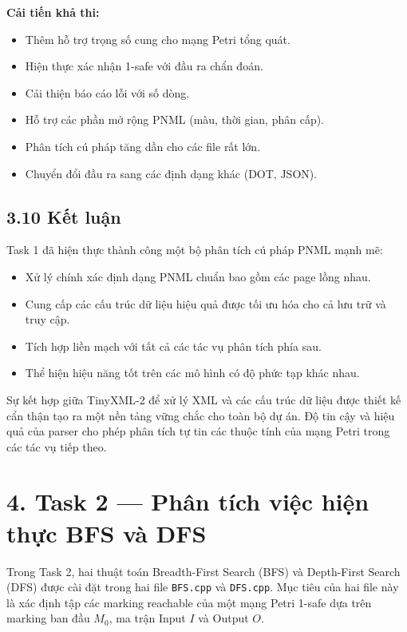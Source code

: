 \documentclass[12pt,a4paper]{article}
\begin{document}
\textbf{Cải tiến khả thi:}
\begin{itemize}
    \item Thêm hỗ trợ trọng số cung cho mạng Petri tổng quát.
    \item Hiện thực xác nhận 1-safe với đầu ra chẩn đoán.
    \item Cải thiện báo cáo lỗi với số dòng.
    \item Hỗ trợ các phần mở rộng PNML (màu, thời gian, phân cấp).
    \item Phân tích cú pháp tăng dần cho các file rất lớn.
    \item Chuyển đổi đầu ra sang các định dạng khác (DOT, JSON).
\end{itemize}

\subsection*{3.10 Kết luận}

Task 1 đã hiện thực thành công một bộ phân tích cú pháp PNML mạnh mẽ:
\begin{itemize}
    \item Xử lý chính xác định dạng PNML chuẩn bao gồm các page lồng nhau.
    \item Cung cấp các cấu trúc dữ liệu hiệu quả được tối ưu hóa cho cả lưu trữ và truy cập.
    \item Tích hợp liền mạch với tất cả các tác vụ phân tích phía sau.
    \item Thể hiện hiệu năng tốt trên các mô hình có độ phức tạp khác nhau.
\end{itemize}

Sự kết hợp giữa TinyXML-2 để xử lý XML và các cấu trúc dữ liệu được thiết kế cẩn thận tạo ra một nền tảng vững chắc cho toàn bộ dự án. Độ tin cậy và hiệu quả của parser cho phép phân tích tự tin các thuộc tính của mạng Petri trong các tác vụ tiếp theo.

\section*{4. Task 2 --- Phân tích việc hiện thực BFS và DFS}

Trong Task 2, hai thuật toán Breadth-First Search (BFS) và Depth-First Search (DFS) được cài đặt trong hai file \texttt{BFS.cpp} và \texttt{DFS.cpp}. Mục tiêu của hai file này là xác định tập các marking reachable của một mạng Petri 1-safe dựa trên marking ban đầu $M_0$, ma trận Input $I$ và Output $O$.
\end{document}
